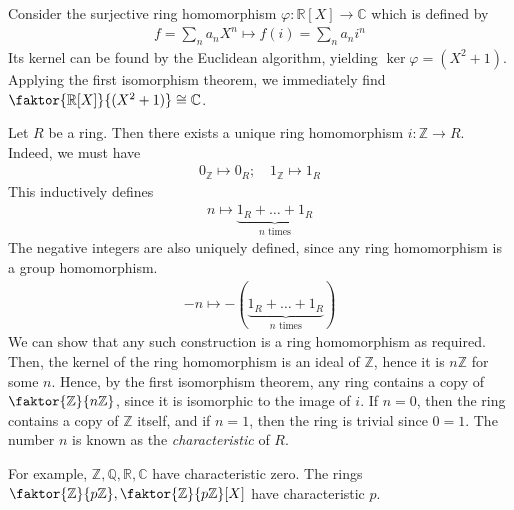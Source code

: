 \begin{example}
	Consider the surjective ring homomorphism $\varphi \colon \mathbb R[X] \to \mathbb C$ which is defined by
	\begin{align*}
		f = \sum_n a_n X^n \mapsto f(i) = \sum_n a_n i^n
	\end{align*}
	Its kernel can be found by the Euclidean algorithm, yielding $\ker \varphi = (X^2 + 1)$.
	Applying the first isomorphism theorem, we immediately find $\faktor{\mathbb R[X]}{(X^2 + 1)} \cong \mathbb C$.
\end{example}
\begin{example}
	Let $R$ be a ring.
	Then there exists a unique ring homomorphism $i \colon \mathbb Z \to R$.
	Indeed, we must have
	\begin{align*}
		0_{\mathbb Z} \mapsto 0_R;\quad 1_{\mathbb Z} \mapsto 1_R
	\end{align*}
	This inductively defines
	\begin{align*}
		n \mapsto \underbrace{1_R + \dots + 1_R}_{n \text{ times}}
	\end{align*}
	The negative integers are also uniquely defined, since any ring homomorphism is a group homomorphism.
	\begin{align*}
		-n \mapsto -(\underbrace{1_R + \dots + 1_R}_{n \text{ times}})
	\end{align*}
	We can show that any such construction is a ring homomorphism as required.
	Then, the kernel of the ring homomorphism is an ideal of $\mathbb Z$, hence it is $n\mathbb Z$ for some $n$.
	Hence, by the first isomorphism theorem, any ring contains a copy of $\faktor{\mathbb Z}{n\mathbb Z}$, since it is isomorphic to the image of $i$.
	If $n = 0$, then the ring contains a copy of $\mathbb Z$ itself, and if $n = 1$, then the ring is trivial since $0 = 1$.
	The number $n$ is known as the \textit{characteristic} of $R$.

	For example, $\mathbb Z, \mathbb Q, \mathbb R, \mathbb C$ have characteristic zero.
	The rings $\faktor{\mathbb Z}{p \mathbb Z}, \faktor{\mathbb Z}{p \mathbb Z}[X]$ have characteristic $p$.
\end{example}

